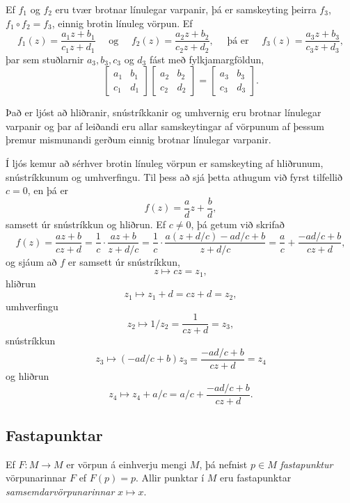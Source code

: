 Ef $f_1$ og $f_2$ eru tvær brotnar línulegar varpanir, þá er 
samskeyting þeirra $f_3$, $f_1\circ f_2=f_3$,
einnig brotin línuleg vörpun.  Ef
$$
f_1(z)=\dfrac{a_1z+b_1}{c_1z+d_1} \quad \text{ og } \quad
f_2(z)=\dfrac{a_2z+b_2}{c_2z+d_2},
\quad \text{ þá er  } \quad 
f_3(z)=\dfrac{a_3z+b_3}{c_3z+d_3},
$$
þar sem stuðlarnir $a_3,b_3,c_3$ og $d_3$ fást með fylkjamargföldun,
$$
\left[\begin{matrix} a_1&b_1\\c_1&d_1\end{matrix}\right]
\left[\begin{matrix} a_2&b_2\\c_2&d_2\end{matrix}\right]
=
\left[\begin{matrix} a_3&b_3\\c_3&d_3\end{matrix}\right].
$$

Það er ljóst að hliðranir, snústríkkanir og umhvernig eru brotnar
línulegar varpanir og þar af leiðandi eru allar samskeytingar af 
vörpunum af þessum þremur mismunandi gerðum einnig brotnar
línulegar varpanir. 

Í ljós kemur að 
  sérhver brotin línuleg vörpun er samskeyting af
hliðrunum, snústríkkunum
og umhverfingu.  Til þess að sjá þetta athugum við fyrst tilfellið
$c=0$, en þá er
 $$f(z)=\frac adz+\frac bd,
 $$
samsett  úr snústríkkun og hliðrun.  Ef $c\neq 0$, þá getum við
skrifað
 $$f(z)= \dfrac{az+b}{cz+d}=\dfrac 1c\cdot \dfrac{az+b}{z+d/c}=
\dfrac 1c\cdot \dfrac{a(z+d/c)-ad/c+b}{z+d/c}=
\dfrac ac+\dfrac{-ad/c+b}{cz+d}, 
 $$
og sjáum að $f$ er samsett  úr snústríkkun, 
$$
z\mapsto cz=z_1,
$$
hliðrun 
$$z_1\mapsto z_1+d=cz+d=z_2,
$$ 
umhverfingu 
$$z_2\mapsto 1/z_2 = \dfrac 1{cz+d}=z_3,
$$
snústríkkun 
$$
z_3\mapsto (-ad/c+b)z_3=\dfrac{-ad/c+b}{cz+d}=z_4
$$ 
og hliðrun
$$
z_4\mapsto z_4+a/c=a/c+\dfrac{-ad/c+b}{cz+d}.
$$


\subsection*{Fastapunktar}

Ef $F:M\to M$ er vörpun á einhverju mengi $M$, þá nefnist 
$p\in M$ {\it fastapunktur} vörpunarinnar $F$ ef $F(p)=p$.
Allir punktar í $M$ eru fastapunktar {\it samsemdarvörpunarinnar}
$x\mapsto x$.

